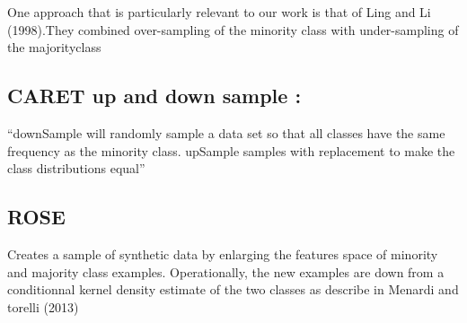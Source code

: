\documentclass[
]{report}
\begin{document}
One approach that is particularly relevant to our work is that of Ling and Li (1998).They combined over-sampling of the minority class with under-sampling of the majorityclass

\hypertarget{caret-up-and-down-sample}{%
\subsection{CARET up and down sample :}\label{caret-up-and-down-sample}}

``downSample will randomly sample a data set so that all classes have the same frequency as the minority class. upSample samples with replacement to make the class distributions equal''

\hypertarget{rose}{%
\subsection{ROSE}\label{rose}}

Creates a sample of synthetic data by enlarging the features space of minority and majority class examples. Operationally, the new examples are down from a conditionnal kernel density estimate of the two classes as describe in Menardi and torelli (2013)
\end{document}
